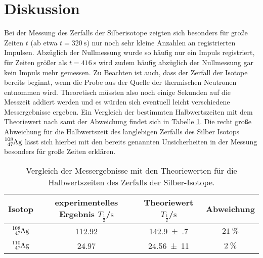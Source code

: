\section{Diskussion}
\label{sec:Diskussion}
Bei der Messung des Zerfalls der Silberisotope zeigten sich besonders für große Zeiten $t$ (ab etwa $t=\SI{320}{\second}$) nur noch sehr kleine Anzahlen an registrierten Impulsen. Abzüglich der Nullmessung wurde so häufig nur ein Impuls registriert, für Zeiten größer als $t=\SI{416}{\second}$ wird zudem häufig abzüglich der Nullmessung gar kein Impuls mehr gemessen.
Zu Beachten ist auch, dass der Zerfall der Isotope bereits beginnt, wenn die Probe aus der Quelle der thermischen Neutronen entnommen wird.
Theoretisch müssten also noch einige Sekunden auf die Messzeit addiert werden und es würden sich eventuell leicht verschiedene Messergebnisse ergeben.
Ein Vergleich der bestimmten Halbwertszeiten mit dem Theoriewert nach \cite{silber} samt der Abweichung findet sich in Tabelle \ref{tab:theor}. Die recht große Abweichung für die Halbwertszeit des langlebigen Zerfalls des Silber Isotops $\ce{^{108}_47Ag}$ lässt sich hierbei mit den bereits genannten Unsicherheiten in der Messung besonders für große Zeiten erklären.
\begin{table}
  \centering
  \caption{Vergleich der Messergebnisse mit den Theoriewerten für die Halbwertszeiten des Zerfalls der Silber-Isotope.}
  \label{tab:theor}
  \begin{tabular}{cccc}
  \toprule
  Isotop&experimentelles Ergebnis $T_\frac{1}{2}$/$\si{\second}$&Theoriewert $T_\frac{1}{2}$/$\si{\second}$ &Abweichung\\
  \midrule
  $\ce{^{108}_47Ag}$&\num{112.92}&\num{142.9(7)}&$\SI{21}{\percent}$\\
  $\ce{^{110}_47Ag}$&\num{24.97}&\num{24,56(11)}&$\SI{2}{\percent}$\\
  \bottomrule
  \end{tabular}
\end{table}
